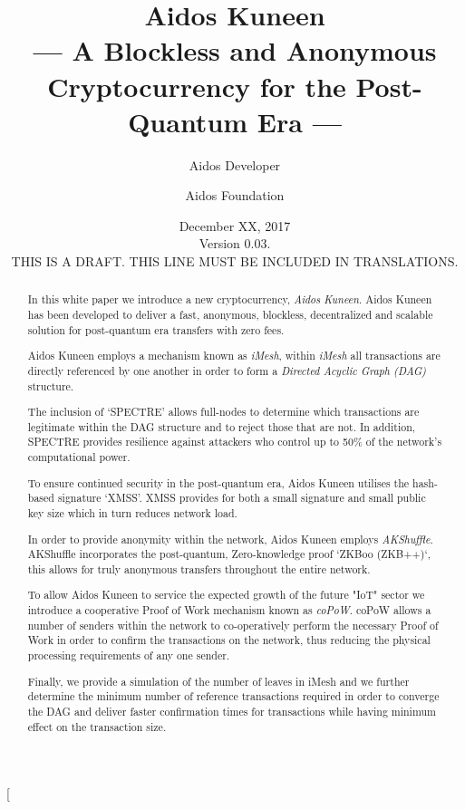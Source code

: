 \documentclass[a4paper,10pt,twocolumn]{article}
\title{Aidos Kuneen \\ --- A Blockless and Anonymous Cryptocurrency for the Post-Quantum Era ---}
\author{
	Aidos Developer \and Aidos Foundation
}
\date{December XX, 2017 \\ Version 0.03.\\ THIS IS A DRAFT. THIS LINE MUST BE INCLUDED IN TRANSLATIONS.}
\begin{document}
\twocolumn[
	\maketitle

\begin{abstract}
		In this white paper we introduce a new cryptocurrency, \emph{Aidos Kuneen}. Aidos Kuneen has been developed to deliver a 
		fast, anonymous, blockless, decentralized and scalable solution for post-quantum era transfers with zero fees. 
		
		Aidos Kuneen employs a mechanism known as \emph{iMesh}, within \emph{iMesh} all transactions are directly referenced by
		one another in order to form a \emph{Directed Acyclic Graph (DAG)} structure.
		
		The inclusion of `SPECTRE' allows full-nodes to determine which transactions are legitimate within the DAG structure and
		to reject those that are not. In addition, SPECTRE provides resilience against attackers who control up to 50\% of the
		network's computational power.
		
		To ensure continued security in the post-quantum era, Aidos Kuneen utilises the hash-based signature `XMSS'. XMSS
		provides for both a small signature and small public key size which in turn reduces network load.
	
		In order to provide anonymity within the network, Aidos Kuneen employs \emph{AKShuffle}. AKShuffle 	
		incorporates the post-quantum, Zero-knowledge proof `ZKBoo (ZKB++)`, this allows for truly anonymous transfers 
		throughout the entire network.
		
		To allow Aidos Kuneen to service the expected growth of the future "IoT" sector we introduce a cooperative Proof of Work
		mechanism known as \emph{coPoW}. coPoW allows a number of senders within the network to co-operatively perform the 
		necessary Proof of Work in order to confirm the transactions on the network, thus reducing the physical processing 
		requirements of any one sender.
		
		Finally, we provide a simulation of the number of leaves in iMesh and we further determine the minimum number of 
		reference transactions required in order to converge the DAG and deliver faster confirmation times for transactions 
		while having minimum effect on the transaction size.
		
		\end{abstract}

		\vspace{5cm}
\end{document}
